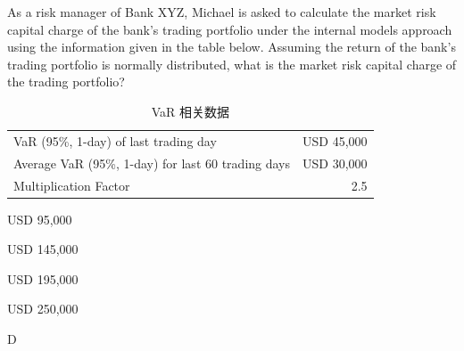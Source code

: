 \documentclass{article}
\newcounter{question} %
\begin{document}
\begin{question}
    As a risk manager of Bank XYZ, Michael is asked to calculate the market risk capital charge of the bank's trading portfolio under the internal models approach using the information given in the table below. Assuming the return of the bank's trading portfolio is normally distributed, what is the market risk capital charge of the trading portfolio?

    \begin{table}[htbp]
        \centering
        \begin{tabular}{l r}
            \hline
            VaR (95\%, 1-day) of last trading day                & USD 45,000 \\
            Average VaR (95\%, 1-day) for last 60 trading days   & USD 30,000 \\
            Multiplication Factor                                & 2.5 \\
            \hline
        \end{tabular}
        \caption{VaR 相关数据}
    \end{table}
\end{question}

\begin{choices}
    \item USD 95,000
    \item USD 145,000
    \item USD 195,000
    \item USD 250,000
\end{choices}

\begin{correctanswer}
    D
\end{correctanswer}
\end{document}

